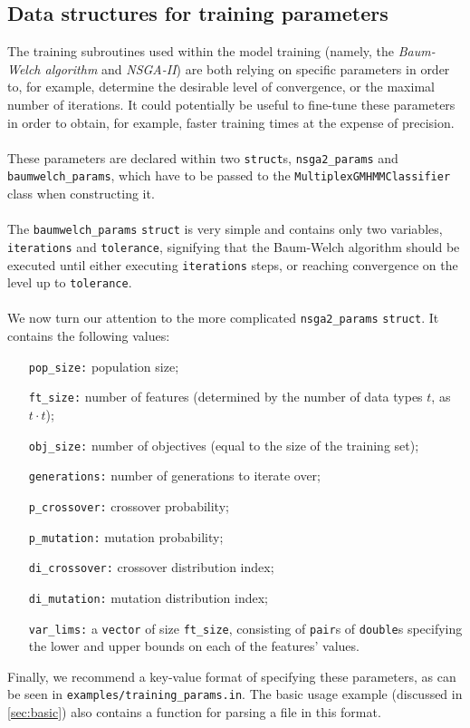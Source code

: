 \documentclass[12pt]{article}
\begin{document}
	\subsection{Data structures for training parameters}\label{sec:trnparam}
	The training subroutines used within the model training (namely, the \emph{Baum-Welch algorithm} and \emph{NSGA-II}) are both relying on specific parameters in order to, for example, determine the desirable level of convergence, or the maximal number of iterations. It could potentially be useful to fine-tune these parameters in order to obtain, for example, faster training times at the expense of precision.\\ \\
	These parameters are declared within two {\tt struct}s, {\tt nsga2\_params} and {\tt baumwelch\_params}, which have to be passed to the {\tt MultiplexGMHMMClassifier} class when constructing it.\\ \\
	The {\tt baumwelch\_params} {\tt struct} is very simple and contains only two variables, {\tt iterations} and {\tt tolerance}, signifying that the Baum-Welch algorithm should be executed until either executing {\tt iterations} steps, or reaching convergence on the level up to {\tt tolerance}.\\ \\
	We now turn our attention to the more complicated {\tt nsga2\_params} {\tt struct}. It contains the following values:
	\begin{itemize}
		\item[\tt pop\_size:] population size;
		\item[\tt ft\_size:] number of features (determined by the number of data types $t$, as $t \cdot t$);
		\item[\tt obj\_size:] number of objectives (equal to the size of the training set);
		\item[\tt generations:] number of generations to iterate over;
		\item[\tt p\_crossover:] crossover probability;
		\item[\tt p\_mutation:] mutation probability;
		\item[\tt di\_crossover:] crossover distribution index;
		\item[\tt di\_mutation:] mutation distribution index;
		\item[\tt var\_lims:] a {\tt vector} of size {\tt ft\_size}, consisting of {\tt pair}s of {\tt double}s specifying the lower and upper bounds on each of the features' values.
	\end{itemize}
	Finally, we recommend a key-value format of specifying these parameters, as can be seen in {\tt examples/training\_params.in}. The basic usage example (discussed in \cref{sec:basic}) also contains a function for parsing a file in this format.
\end{document}
